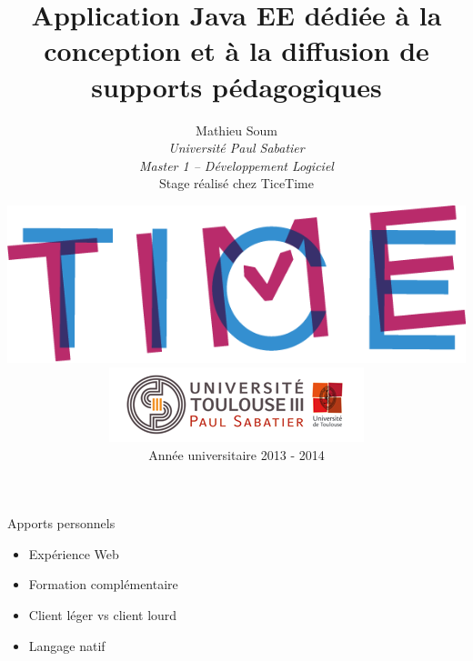 \documentclass[xcolor=x11names,compress]{beamer}
\renewcommand{\(}{\begin{columns}}
\renewcommand{\)}{\end{columns}}
\newcommand{\<}[1]{\begin{column}{#1}}
\renewcommand{\>}{\end{column}}
\begin{document}
\begin{frame}{Apports personnels}
  \vfill
  \begin{itemize}
	\item Expérience Web
	\item Formation complémentaire
  \end{itemize}
  \vfill
  \begin{itemize}
	\item Client léger vs client lourd
	\item Langage natif
  \end{itemize}
\end{frame}

\section*{}

\begin{frame}
  \title{Application Java EE dédiée à la conception et à la diffusion de supports
  pédagogiques}
  \author{
	  Mathieu Soum\\
	  {\it Université Paul Sabatier}\\
	  {\it Master 1 -- Développement Logiciel}\\
	  \vspace{5px}
	  Stage réalisé chez TiceTime
	\vspace{-15px}
  }
  \date{
	  {
		\includegraphics[scale=0.13]{images/ticetime}\hspace{75px}\includegraphics[scale=0.37]{images/ups}
	  }
	  \\
	  \vspace{15px}
	  Année universitaire 2013 - 2014
  }
  \titlepage
\end{frame}
\end{document}
